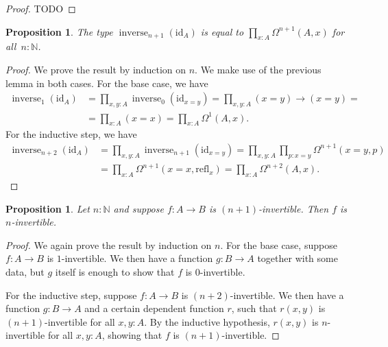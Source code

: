 \documentclass{article}
\theoremstyle{plain}
\newtheorem{proposition}[theorem]{Proposition}
\theoremstyle{definition}
\theoremstyle{remark}
\newcommand{\id}{\mathrm{id}}
\newcommand{\refl}{\mathrm{refl}}
\newcommand{\N}{\mathbb{N}}
\newcommand{\lspace}[1]{\Omega^{#1}}
\DeclareMathOperator{\inverse}{inverse}
\newcommand{\ninverse}[1]{\inverse_{#1}}
\begin{document}
\begin{proof}
  TODO
\end{proof}

\begin{proposition}
  \label{ninv-id}
  The type \(\ninverse{n + 1}(\id_{A})\) is equal to \(\prod_{x : A}\lspace{n + 1}(A, x)\)
  for all~\(n : \N\).
\end{proposition}

\begin{proof}
  We prove the result by induction on \(n\). We make use of the previous lemma in both cases.
  For the base case, we have
  \begin{align*}
    \ninverse{1}(\id_{A}) &= \prod_{x, y : A}\ninverse{0}(\id_{x = y}) =
                              \prod_{x, y : A} (x = y) \to (x = y) = \\
                            &= \prod_{x : A} (x = x) = \prod_{x : A} \lspace{1}(A, x).
  \end{align*}
  For the inductive step, we have
  \begin{align*}
    \ninverse{n + 2}{(\id_{A})} &= \prod_{x, y : A}\ninverse{n + 1}(\id_{x = y}) =
                                  \prod_{x, y : A}\prod_{p : x = y}\lspace{n + 1}(x = y, p) \\
                                &= \prod_{x : A} \lspace{n + 1}(x = x, \refl_{x}) =
                                  \prod_{x : A}\lspace{n + 2}(A, x).
  \end{align*}
\end{proof}

\begin{proposition}
  \label{inverse-system}
  Let \(n : \N\) and suppose \(f : A \to B\) is \((n + 1)\)-invertible.
  Then \(f\) is \(n\)-invertible.
\end{proposition}

\begin{proof}
  We again prove the result by induction on \(n\). For the base case, suppose \(f : A \to B\)
  is \(1\)-invertible. We then have a function \(g : B \to A\) together with some data,
  but \(g\) itself is enough to show that \(f\) is \(0\)-invertible.

  For the inductive step,
  suppose \(f : A \to B\) is \((n + 2)\)-invertible. We then have a function
  \(g : B \to A\) and a certain dependent function \(r\), such that \(r(x, y)\) is
  \((n + 1)\)-invertible for all \(x, y : A\). By the inductive hypothesis, \(r(x, y)\) is
  \(n\)-invertible for all \(x, y : A\), showing that \(f\) is \((n + 1)\)-invertible.
\end{proof}
\end{document}
